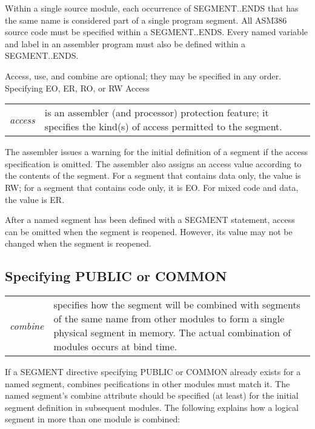 Within a single source module, each occurrence of SEGMENT..ENDS that has the same name is considered part of a single program segment. All ASM386 source code must be specified within a SEGMENT..ENDS. Every named variable and label in an assembler program must also be defined within a SEGMENT..ENDS.

Access, use, and combine are optional; they may be specified in any order. Specifying EO, ER, RO, or RW Access

\begin{tabular}{p{1.5cm} p{12.9cm}}
\emph{access} & is an assembler (and processor) protection feature; it specifies the kind(s) of access permitted to the segment.\\
\end{tabular}

The assembler issues a warning for the initial definition of a segment if the access specification is omitted. The assembler also assigns an access value according to the contents of the segment. For a segment that contains data only, the value is RW; for a segment that contains code only, it is EO. For mixed code and data, the value is ER.

After a named segment has been defined with a SEGMENT statement, access can be omitted when the segment is reopened. However, its value may not be changed when the segment is reopened.

\subsection*{Specifying PUBLIC or COMMON}

\begin{tabular}{p{1.5cm} p{12.9cm}}
\emph{combine} & specifies how the segment will be combined with segments of the same name from other modules to form a single physical segment in memory. The actual combination of modules occurs at bind time.\\
\end{tabular}

If a SEGMENT directive specifying PUBLIC or COMMON already exists for a named segment, combines pecifications in other modules must match it. The named segment's combine attribute should be specified (at least) for the initial segment definition in subsequent modules. The following explains how a logical segment in more than one module is combined:

